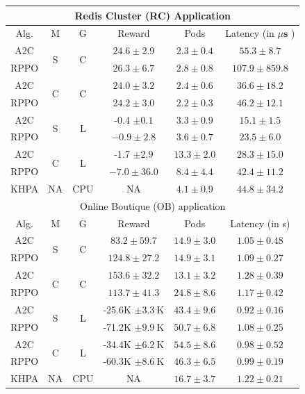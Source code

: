 \documentclass[10pt]{article}
\begin{document}
\begin{center}
\begin{tabular}{|c|c|c|c|c|c|}
\hline
\multicolumn{6}{|c|}{Redis Cluster (RC) Application} \\
\hline
Alg. & M & G & Reward & Pods & Latency (in $\mu \mathbf{s}$ ) \\
\hline
A2C & \multirow[t]{2}{*}{S} & \multirow[t]{2}{*}{C} & $24.6 \pm 2.9$ & $2.3 \pm 0.4$ & $55.3 \pm 8.7$ \\
\hline
RPPO &  &  & $26.3 \pm 6.7$ & $2.8 \pm 0.8$ & $107.9 \pm 859.8$ \\
\hline
A2C & \multirow[t]{2}{*}{C} & \multirow[t]{2}{*}{C} & $24.0 \pm 3.2$ & $2.4 \pm 0.6$ & $36.6 \pm 18.2$ \\
\hline
RPPO &  &  & $24.2 \pm 3.0$ & $2.2 \pm 0.3$ & $46.2 \pm 12.1$ \\
\hline
A2C & \multirow[b]{2}{*}{S} & \multirow[t]{2}{*}{L} & -0.4 $\pm 0.1$ & $3.3 \pm 0.9$ & $15.1 \pm 1.5$ \\
\hline
RPPO &  &  & $-0.9 \pm 2.8$ & $3.6 \pm 0.7$ & $23.5 \pm 6.0$ \\
\hline
A2C & \multirow[t]{2}{*}{C} & \multirow[b]{2}{*}{L} & -1.7 $\pm 2.9$ & $13.3 \pm 2.0$ & $28.3 \pm 15.0$ \\
\hline
RPPO &  &  & $-7.0 \pm 36.0$ & $8.4 \pm 4.4$ & $42.4 \pm 11.2$ \\
\hline
KHPA & NA & CPU & NA & $4.1 \pm 0.9$ & $44.8 \pm 34.2$ \\
\hline
\multicolumn{6}{|c|}{Online Boutique (OB) application} \\
\hline
Alg. & M & G & Reward & Pods & Latency (in s) \\
\hline
A2C & \multirow[t]{2}{*}{S} & \multirow[t]{2}{*}{C} & $83.2 \pm 59.7$ & $14.9 \pm 3.0$ & $1.05 \pm 0.48$ \\
\hline
RPPO &  &  & $124.8 \pm 27.2$ & $14.9 \pm 3.1$ & $1.09 \pm 0.27$ \\
\hline
A2C & \multirow[t]{2}{*}{C} & \multirow[t]{2}{*}{C} & $153.6 \pm 32.2$ & $13.1 \pm 3.2$ & $1.28 \pm 0.39$ \\
\hline
RPPO &  &  & $113.7 \pm 41.3$ & $24.8 \pm 8.6$ & $1.17 \pm 0.42$ \\
\hline
A2C & \multirow[t]{2}{*}{S} & \multirow[t]{2}{*}{L} & -25.6K $\pm 3.3 \mathrm{~K}$ & $43.4 \pm 9.6$ & $0.92 \pm 0.16$ \\
\hline
RPPO &  &  & -71.2K $\pm 9.9 \mathrm{~K}$ & $50.7 \pm 6.8$ & $1.08 \pm 0.25$ \\
\hline
A2C & \multirow[b]{2}{*}{C} & \multirow[t]{2}{*}{L} & -34.4K $\pm 6.2 \mathrm{~K}$ & $54.5 \pm 8.6$ & $0.98 \pm 0.52$ \\
\hline
RPPO &  &  & -60.3K $\pm 8.6 \mathrm{~K}$ & $46.3 \pm 6.5$ & $0.99 \pm 0.19$ \\
\hline
KHPA & NA & CPU & NA & $16.7 \pm 3.7$ & $1.22 \pm 0.21$ \\
\hline
\end{tabular}
\end{center}
\end{document}
